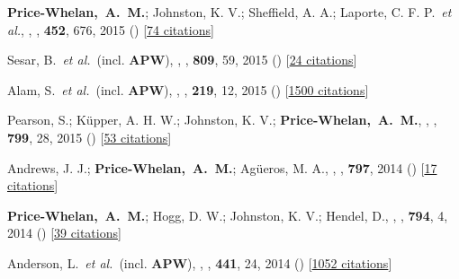 \item[{\color{deemph}\scriptsize18}]\textbf{Price-Whelan,~A.~M.}; Johnston, K. V.; Sheffield, A. A.; Laporte, C. F. P.~\textit{et al.}, , \mnras, \textbf{452}, 676, 2015 () [\href{http://adsabs.harvard.edu/abs/2015MNRAS.452..676P}{74 citations}]

\item[{\color{deemph}\scriptsize17}]Sesar, B.~\textit{et al.}~(incl. \textbf{APW}), , \apj, \textbf{809}, 59, 2015 () [\href{http://adsabs.harvard.edu/abs/2015ApJ...809...59S}{24 citations}]

\item[{\color{deemph}\scriptsize16}]Alam, S.~\textit{et al.}~(incl. \textbf{APW}), , \apjs, \textbf{219}, 12, 2015 () [\href{http://adsabs.harvard.edu/abs/2015ApJS..219...12A}{1500 citations}]

\item[{\color{deemph}\scriptsize15}]Pearson, S.; K{\"u}pper, A. H. W.; Johnston, K. V.; \textbf{Price-Whelan,~A.~M.}, , \apj, \textbf{799}, 28, 2015 () [\href{http://adsabs.harvard.edu/abs/2015ApJ...799...28P}{53 citations}]

\item[{\color{deemph}\scriptsize14}]Andrews, J. J.; \textbf{Price-Whelan,~A.~M.}; Ag{\"u}eros, M. A., , \apj, \textbf{797}, 2014 () [\href{http://adsabs.harvard.edu/abs/2014ApJ...797L..32A}{17 citations}]

\item[{\color{deemph}\scriptsize13}]\textbf{Price-Whelan,~A.~M.}; Hogg, D. W.; Johnston, K. V.; Hendel, D., , \apj, \textbf{794}, 4, 2014 () [\href{http://adsabs.harvard.edu/abs/2014ApJ...794....4P}{39 citations}]

\item[{\color{deemph}\scriptsize12}]Anderson, L.~\textit{et al.}~(incl. \textbf{APW}), , \mnras, \textbf{441}, 24, 2014 () [\href{http://adsabs.harvard.edu/abs/2014MNRAS.441...24A}{1052 citations}]

